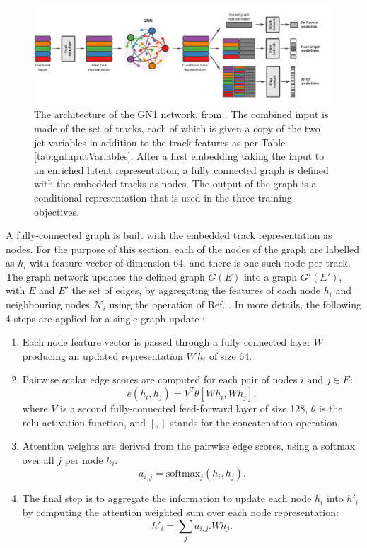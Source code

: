 \begin{figure}[h!]
  \center
  \includegraphics[width=0.99\textwidth]{Images/FTAG/GN/Intro/gnn_architecture.png}
  \caption{The architecture of the GN1 network, from \cite{ATL-PHYS-PUB-2022-027}. The combined input is made of the set of tracks, each of which is given a copy of the two jet variables in addition to the track features as per Table \ref{tab:gnInputVariables}. After a first embedding taking the input to an enriched latent representation, a fully connected graph is defined with the embedded tracks as nodes. The output of the graph is a conditional representation that is used in the three training objectives.} 
  \label{fig:gnnArchitecture}
\end{figure}

A fully-connected graph is built with the embedded track representation as nodes. For the purpose of this section, each of the nodes of the graph are labelled as $h_i$ with feature vector of dimension 64, and there is one such node per track. The graph network updates the defined graph $G(E)$ into a graph $G'(E')$, with $E$ and $E'$ the set of edges, by aggregating the features of each node $h_i$ and neighbouring nodes $\mathcal{N}_i$ using the operation of Ref. \cite{brody2022how}. In more details, the following 4 steps are applied for a single graph update \cite{ATL-PHYS-PUB-2022-027}:
\begin{enumerate}
  \item Each node feature vector is passed through a fully connected layer $W$ producing an updated representation $W\,h_i$ of size 64.
  \item Pairwise scalar edge scores are computed for each pair of nodes $i$ and $j \in E$: 
  \begin{equation}
    e\left(h_i, h_j\right) = V^T \theta [Wh_i, Wh_j],
  \end{equation}
  where $V$ is a second fully-connected feed-forward layer of size 128, $\theta$ is the \gls{relu} activation function, and $[,]$ stands for the concatenation operation. 
  \item Attention weights are derived from the pairwise edge scores, using a softmax over all $j$ per node $h_i$:
  \begin{equation}
    a_{i,j} = \textrm{softmax}_j\left(h_i, h_j\right).
  \end{equation}
  \item The final step is to aggregate the information to update each node $h_i$ into $h'_i$ by computing the attention weighted sum over each node representation: 
  \begin{equation}
    h'_i = \sum_j a_{i,j} . W h_j.
  \end{equation} 
\end{enumerate}

